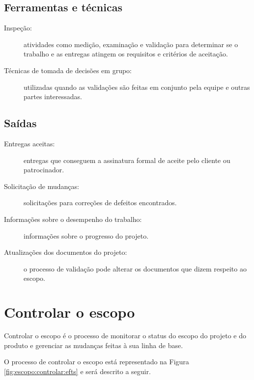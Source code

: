 \section{Ferramentas e técnicas}

\begin{description}
	
	\item[Inspeção:] atividades como medição, examinação e validação para determinar se o trabalho e as entregas atingem os requisitos e critérios de aceitação.
	
	\item[Técnicas de tomada de decisões em grupo:] utilizadas quando as validações são feitas em conjunto pela equipe e outras partes interessadas.
	
\end{description}

\section{Saídas}

\begin{description}
	
	\item[Entregas aceitas:] entregas que conseguem a assinatura formal de aceite pelo cliente ou patrocinador.
	
	\item[Solicitação de mudanças:] solicitações para correções de defeitos encontrados.
	
	\item[Informações sobre o desempenho do trabalho:] informações sobre o progresso do projeto.
	
	\item[Atualizações dos documentos do projeto:] o processo de validação pode alterar os documentos que dizem respeito ao escopo.
	
\end{description}


\chapter{Controlar o escopo}

Controlar o escopo é o processo de monitorar o status do escopo do projeto e do produto e gerenciar as mudanças feitas à sua linha de base.

O processo de controlar o escopo está representado na Figura \ref{fig:escopo:controlar:efts} e será descrito a seguir.

